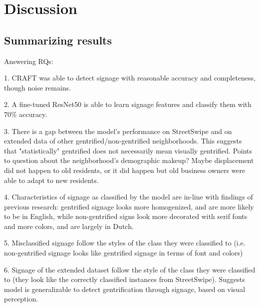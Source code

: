 \section{Discussion}
\label{sec:discussion}

\subsection{Summarizing results}
Answering RQs:

1. CRAFT was able to detect signage with reasonable accuracy and completeness, though noise remains.

2. A fine-tuned ResNet50 is able to learn signage features and classify them with 70\% accuracy.

3. There is a gap between the model's performance on StreetSwipe and on extended data of other gentrified/non-gentrified neighborhoods. This suggests that "statistically" gentrified does not necessarily mean visually gentrified. Points to question about the neighborhood's demographic makeup? Maybe displacement did not happen to old residents, or it did happen but old business owners were able to adapt to new residents.

4. Characteristics of signage as classified by the model are in-line with findings of previous research: gentrified signage looks more homogenized, and are more likely to be in English, while non-gentrified signs look more decorated with serif fonts and more colors, and are largely in Dutch.

5. Misclassified signage follow the styles of the class they were classified to (i.e. non-gentrified signage looks like gentrified signage in terms of font and colors)

6. Signage of the extended dataset follow the style of the class they were classified to (they look like the correctly classified instances from StreetSwipe). Suggests model is generalizable to detect gentrification through signage, based on visual perception.

